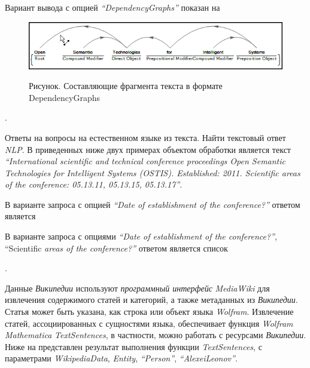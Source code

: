 Вариант вывода с опцией \textit{``DependencyGraphs''} показан на \textit{}
\begin{figure}[H]
	\caption{Рисунок. Составляющие фрагмента текста в формате DependencyGraphs}
	\includegraphics[scale=0.71]{images/part7/chapter_integration/integr_alg5.png}
	\label{fig:integr_alg5}
\end{figure}

.

Ответы на вопросы на естественном языке из текста. Найти текстовый ответ \textit{NLP}. 
В приведенных ниже двух примерах объектом обработки является текст \textit{``International scientific and technical conference proceedings Open Semantic Technologies for Intelligent Systems (OSTIS). Established: 2011. Scientific areas of the conference: 05.13.11, 05.13.15, 05.13.17''}.

В варианте запроса с опцией \textit{``Date of establishment of the conference?''} ответом является
\begin{center}
\end{center}
В варианте запроса с опциями \textit{``Date of establishment of the conference?''}, ``Scientific \textit{areas of the conference?''} ответом является список 
\begin{center}
\end{center}

.

Данные \textit{Википедии} используют \textit{программный интерфейс} \textit{MediaWiki} для извлечения содержимого статей и категорий, а также метаданных из \textit{Википедии}. Статья может быть указана, как строка или объект языка \textit{Wolfram}. 
Извлечение статей, ассоциированных с сущностями языка, обеспечивает функция \textit{Wolfram Mathematica} \textit{TextSentences}, в частности, можно работать с ресурсами \textit{Википедии}. 
Ниже на \textit{} представлен результат выполнения функции \textit{TextSentences}, с параметрами \textit{WikipediaData}, \textit{Entity}, \textit{``Person''}, \textit{``AlexeiLeonov''}.
 

